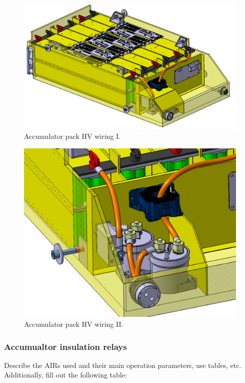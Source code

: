 \begin{figure}[H]
	\centering
	\includegraphics[width=\textwidth]{./img/ACP-view.png}
	\caption{Accumulator pack HV wiring I.}
	\label{fig:acp-hv-wiring}
\end{figure}

\begin{figure}[H]
	\centering
	\includegraphics[width=\textwidth]{./img/ACP-fuse.png}
	\caption{Accumulator pack HV wiring II.}
	\label{fig:acp-hv-wiring2}
\end{figure}

\subsubsection{Accumualtor insulation relays}
Describe the AIRs used and their main operation parameters, use tables, etc.
Additionally, fill out the following table:

